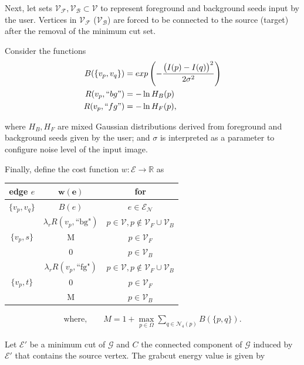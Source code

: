Next, let sets $\mathcal{V_F}, \mathcal{V_B} \subset \mathcal{V}$ to represent foreground and background seeds input by the user. Vertices in $\mathcal{V_F}$ ($\mathcal{V_B}$) are forced to be connected to the source (target) after the removal of the minimum cut set.

Consider the functions
\begin{align*}
	B(\{v_p,v_q\}) &= exp \left( -\frac{ \big(I(p) - I(q)\big)^2}{2\sigma ^2} \right) \\
	R(v_p,``bg") &= -\ln H_B(p)\\
	R(v_p,``fg") &= -\ln H_F(p),
\end{align*}

where $H_B,H_F$ are mixed Gaussian distributions derived from  foreground and background seeds given by the user; and $\sigma$ is interpreted as a parameter to configure noise level of the input image.

Finally, define the cost function $w:\mathcal{E}\rightarrow \mathbb{R}$ as

\begin{table}[H]
\centering
\setlength{\extrarowheight}{0.75em}
\begin{tabular}{|c|c|c|}
\hline
\textbf{edge} $e$ & $\mathbf{w(e)}$ & \textbf{for}\\
\hline
$\{v_p, v_q\}$ & $B(e)$ & $e \in \mathcal{E}_{\mathcal{N}}$\\
\hline
\multirow{3}{*}{$\{v_p, s\}$} & $\lambda_r R(v_p,\text{``bg"})$ & $p \in \mathcal{\mathcal{V}}, p \notin \mathcal{\mathcal{V}}_F \cup \mathcal{\mathcal{V}}_B$\\
& M & $p \in \mathcal{\mathcal{V}}_F$ \\
& 0 & $p \in \mathcal{\mathcal{V}}_B$ \\
\hline
\multirow{3}{*}{$\{v_p, t\}$} & $\lambda_r R(v_p,\text{``fg"})$ & $p \in \mathcal{\mathcal{V}}, p \notin \mathcal{\mathcal{V}}_F \cup \mathcal{\mathcal{V}}_B$\\
& 0 & $p \in \mathcal{\mathcal{V}}_F$ \\
& M & $p \in \mathcal{\mathcal{V}}_B$ \\
\hline
\end{tabular}
\begin{align*}
\text{where,} \qquad M = 1 + \max_{p \in \Omega}{\sum_{q \in \mathcal{N}_4(p)}}{B(\{p,q\})}.
\end{align*}
\end{table}

Let $\mathcal{E}'$ be a minimum cut of $\mathcal{G}$ and $C$ the connected component of $\mathcal{G}$ induced by $\mathcal{E}'$ that contains the source vertex. The grabcut energy value is given by

